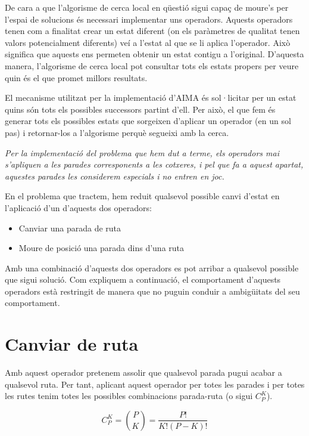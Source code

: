 
De cara a que l'algorisme de cerca local en qüestió sigui capaç de moure's per l'espai de solucions és necessari implementar uns operadors. Aquests operadors tenen com a finalitat crear un estat diferent (on els paràmetres de qualitat tenen valors potencialment diferents) veí a l'estat al que se li aplica l'operador. Això significa que aquests ens permeten obtenir un estat contigu a l'original. D'aquesta manera, l'algorisme de cerca local pot consultar tots els estats propers per veure quin és el que promet millors resultats.

El mecanisme utilitzat per la implementació d'AIMA és sol·licitar per un estat quins són tots els possibles successors partint d'ell. Per això, el que fem és generar tots els possibles estats que sorgeixen d'aplicar un operador (en un sol pas) i retornar-los a l'algorisme perquè segueixi amb la cerca.

\emph{Per la implementació del problema que hem dut a terme, els operadors mai s'apliquen a les parades corresponents a les cotxeres, i pel que fa a aquest apartat, aquestes parades les considerem especials i no entren en joc.}

En el problema que tractem, hem reduit qualsevol possible canvi d'estat en l'aplicació d'un d'aquests dos operadors:

\begin{itemize}
	\item Canviar una parada de ruta
	\item Moure de posició una parada dins d'una ruta
\end{itemize}

Amb una combinació d'aquests dos operadors es pot arribar a qualsevol possible que sigui solució. Com expliquem a continuació, el comportament d'aquests operadors està restringit de manera que no puguin conduir a ambigüitats del seu comportament.

\section{Canviar de ruta} %
\label{sec:canviar_de_ruta}

Amb aquest operador pretenem assolir que qualsevol parada pugui acabar a qualsevol ruta. Per tant, aplicant aquest operador per totes les parades i per totes les rutes tenim totes les possibles combinacions parada-ruta (o sigui $C_{P}^{K}$).

\[
	C_{P}^{K} = \binom{P}{K} = \dfrac{P!}{K!(P-K)!}
\]

